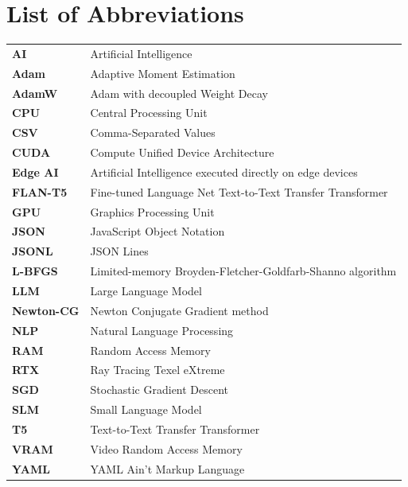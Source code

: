 \chapter*{List of Abbreviations}

\vspace*{0.3cm}

\begin{tabularx}{\textwidth}{>{\bfseries}l X}
AI & Artificial Intelligence \\
Adam & Adaptive Moment Estimation \\
AdamW & Adam with decoupled Weight Decay \\
CPU & Central Processing Unit \\
CSV & Comma-Separated Values \\
CUDA & Compute Unified Device Architecture \\
Edge AI & Artificial Intelligence executed directly on edge devices \\
FLAN-T5 & Fine-tuned Language Net Text-to-Text Transfer Transformer \\
GPU & Graphics Processing Unit \\
JSON & JavaScript Object Notation \\
JSONL & JSON Lines \\
L-BFGS & Limited-memory Broyden-Fletcher-Goldfarb-Shanno algorithm \\
LLM & Large Language Model \\
Newton-CG & Newton Conjugate Gradient method \\
NLP & Natural Language Processing \\
RAM & Random Access Memory \\
RTX & Ray Tracing Texel eXtreme \\
SGD & Stochastic Gradient Descent \\
SLM & Small Language Model \\
T5 & Text-to-Text Transfer Transformer \\
VRAM & Video Random Access Memory \\
YAML & YAML Ain't Markup Language \\
\end{tabularx}

